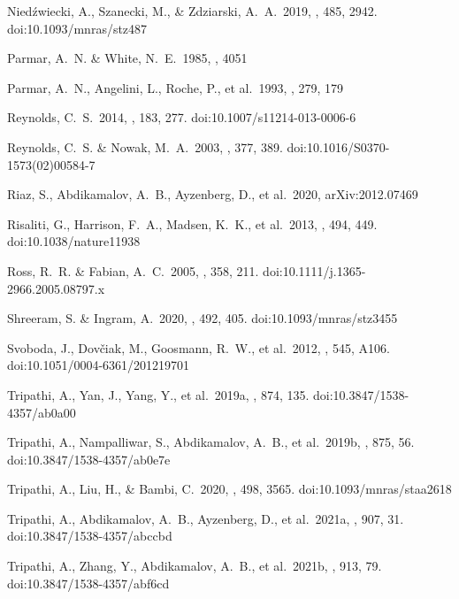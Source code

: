 \documentclass[twocolumn]{emulateapj}
\begin{document}
\begin{thebibliography}{99}
 Nied{\'z}wiecki, A., Szanecki, M., \& Zdziarski, A.~A.\ 2019, \mnras, 485, 2942. doi:10.1093/mnras/stz487

 Parmar, A.~N. \& White, N.~E.\ 1985, \iaucirc, 4051

 Parmar, A.~N., Angelini, L., Roche, P., et al.\ 1993, \aap, 279, 179

 Reynolds, C.~S.\ 2014, \ssr, 183, 277. doi:10.1007/s11214-013-0006-6

 Reynolds, C.~S. \& Nowak, M.~A.\ 2003, \physrep, 377, 389. doi:10.1016/S0370-1573(02)00584-7

 Riaz, S., Abdikamalov, A.~B., Ayzenberg, D., et al.\ 2020, arXiv:2012.07469

 Risaliti, G., Harrison, F.~A., Madsen, K.~K., et al.\ 2013, \nat, 494, 449. doi:10.1038/nature11938

 Ross, R.~R. \& Fabian, A.~C.\ 2005, \mnras, 358, 211. doi:10.1111/j.1365-2966.2005.08797.x

 Shreeram, S. \& Ingram, A.\ 2020, \mnras, 492, 405. doi:10.1093/mnras/stz3455

 Svoboda, J., Dov{\v{c}}iak, M., Goosmann, R.~W., et al.\ 2012, \aap, 545, A106. doi:10.1051/0004-6361/201219701

 Tripathi, A., Yan, J., Yang, Y., et al.\ 2019a, \apj, 874, 135. doi:10.3847/1538-4357/ab0a00

 Tripathi, A., Nampalliwar, S., Abdikamalov, A.~B., et al.\ 2019b, \apj, 875, 56. doi:10.3847/1538-4357/ab0e7e

 Tripathi, A., Liu, H., \& Bambi, C.\ 2020, \mnras, 498, 3565. doi:10.1093/mnras/staa2618

 Tripathi, A., Abdikamalov, A.~B., Ayzenberg, D., et al.\ 2021a, \apj, 907, 31. doi:10.3847/1538-4357/abccbd

 Tripathi, A., Zhang, Y., Abdikamalov, A.~B., et al.\ 2021b, \apj, 913, 79. doi:10.3847/1538-4357/abf6cd


\end{thebibliography}
\end{document}
